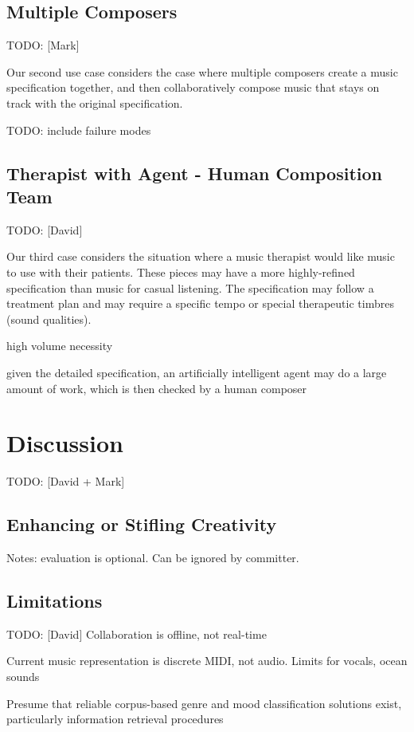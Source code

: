 \documentclass[final,authoryear,11pt,times]{elsarticle}
\begin{document}
\subsection{Multiple Composers}
TODO: [Mark]

Our second use case considers the case where multiple composers create a music specification together, and then collaboratively compose music that stays on track with the original specification.

TODO: include failure modes

\subsection{Therapist with Agent - Human Composition Team}

TODO: [David]

Our third case considers the situation where a music therapist would like music to use with their patients. These pieces may have a more highly-refined specification than music for casual listening. The specification may follow a treatment plan and may require a specific tempo or special therapeutic timbres (sound qualities).

high volume necessity

given the detailed specification, an artificially intelligent agent may do a large amount of work, which is then checked by a human composer


\section{Discussion}

TODO: [David + Mark]
\subsection{Enhancing or Stifling Creativity}

Notes: evaluation is optional. Can be ignored by committer.

\subsection{Limitations}

TODO: [David]
Collaboration is offline, not real-time

Current music representation is discrete MIDI, not audio. Limits for vocals, ocean sounds

Presume that reliable corpus-based genre and mood classification solutions exist, particularly information retrieval procedures
\end{document}
